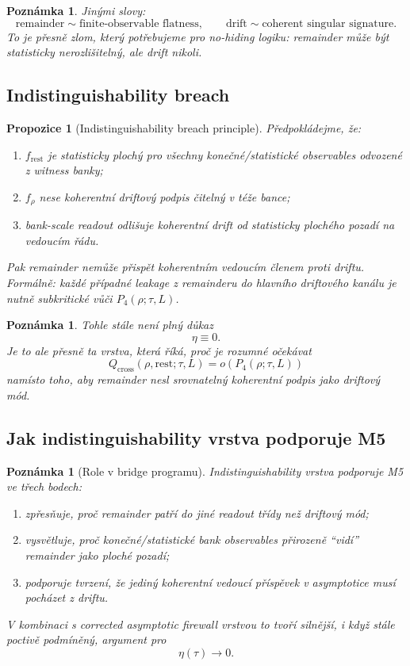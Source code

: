 \documentclass[11pt,a4paper]{article}
\newtheorem{remark}[theorem]{Poznámka}
\newtheorem{proposition}[theorem]{Propozice}
\begin{document}
\begin{remark}
Jinými slovy:
\[
\text{remainder} \sim \text{finite-observable flatness},
\qquad
\text{drift} \sim \text{coherent singular signature}.
\]
To je přesně zlom, který potřebujeme pro no-hiding logiku:
remainder může být statisticky nerozlišitelný, ale drift nikoli.
\end{remark}

\subsection*{Indistinguishability breach}

\begin{proposition}[Indistinguishability breach principle]
Předpokládejme, že:
\begin{enumerate}[label=\textbf{(\arabic*)}]
    \item \(f_{\mathrm{rest}}\) je statisticky plochý pro všechny konečné/statistické observables
    odvozené z witness banky;
    \item \(f_\rho\) nese koherentní driftový podpis čitelný v téže bance;
    \item bank-scale readout odlišuje koherentní drift od statisticky plochého pozadí na vedoucím řádu.
\end{enumerate}
Pak remainder nemůže přispět \emph{koherentním vedoucím členem} proti driftu.
Formálně: každé případné leakage z remainderu do hlavního driftového kanálu je nutně subkritické
vůči \(P_4(\rho;\tau,L)\).
\end{proposition}

\begin{remark}
Tohle stále není plný důkaz
\[
\eta\equiv 0.
\]
Je to ale přesně ta vrstva, která říká, proč je rozumné očekávat
\[
Q_{\mathrm{cross}}(\rho,\mathrm{rest};\tau,L)=o(P_4(\rho;\tau,L))
\]
namísto toho, aby remainder nesl srovnatelný koherentní podpis jako driftový mód.
\end{remark}

\subsection*{Jak indistinguishability vrstva podporuje M5}

\begin{remark}[Role v bridge programu]
Indistinguishability vrstva podporuje M5 ve třech bodech:
\begin{enumerate}[label=\textbf{(\arabic*)}]
    \item zpřesňuje, proč remainder patří do jiné readout třídy než driftový mód;
    \item vysvětluje, proč konečné/statistické bank observables přirozeně ``vidí'' remainder jako ploché pozadí;
    \item podporuje tvrzení, že jediný koherentní vedoucí příspěvek v asymptotice musí pocházet z driftu.
\end{enumerate}
V kombinaci s corrected asymptotic firewall vrstvou to tvoří silnější, i když stále poctivě
podmíněný, argument pro
\[
\eta(\tau)\to 0.
\]
\end{remark}
\end{document}
